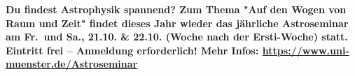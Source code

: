 \begin{landscape}
\smallskip

\textbf{Du findest Astrophysik spannend?
	Zum Thema "Auf den Wogen von Raum und Zeit" findet dieses Jahr wieder das jährliche Astroseminar am Fr.\ und Sa., 21.10. \& 22.10. (Woche nach der Ersti-Woche) statt.
	Eintritt frei -- Anmeldung erforderlich!
	Mehr Infos: \url{https://www.uni-muenster.de/Astroseminar}}
\end{landscape}
